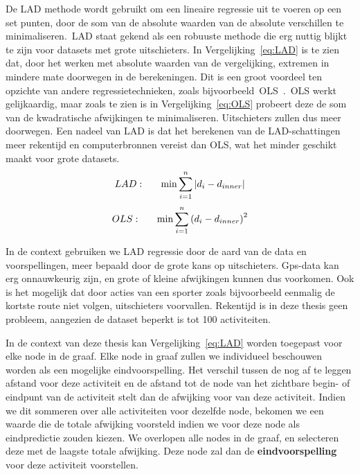 De \ac{LAD} methode wordt gebruikt om een lineaire regressie uit te voeren op
een set punten, door de som van de absolute waarden van de absolute verschillen
te minimaliseren.\ \ac{LAD} staat gekend als een robuuste methode die erg
nuttig blijkt te zijn voor datasets met grote uitschieters. In
Vergelijking~\ref{eq:LAD} is te zien dat, door het werken met absolute waarden
van de vergelijking, extremen in mindere mate doorwegen in de berekeningen. Dit
is een groot voordeel ten opzichte van andere regressietechnieken, zoals
bijvoorbeeld~\ac{OLS}~\cite{iqbal2021application}.~\ac{OLS} werkt gelijkaardig,
maar zoals te zien is in Vergelijking~\ref{eq:OLS} probeert deze de som van de
kwadratische afwijkingen te minimaliseren. Uitschieters zullen dus meer
doorwegen. Een nadeel van \ac{LAD} is dat het berekenen van de LAD-schattingen
meer rekentijd en computerbronnen vereist dan \ac{OLS}, wat het minder geschikt
maakt voor grote datasets.
\begin{equation} \label{eq:LAD}
    LAD:\indent  \min\sum\limits_{i=1}^n|d_i - d_{inner}|
\end{equation}
\begin{equation} \label{eq:OLS}
    OLS:\indent  \min\sum\limits_{i=1}^n{(d_i - d_{inner})}^2
\end{equation}

In de context gebruiken we LAD regressie door de aard van de data en
voorspellingen, meer bepaald door de grote kans op uitschieters. Gps-data kan
erg onnauwkeurig zijn, en grote of kleine afwijkingen kunnen dus voorkomen. Ook
is het mogelijk dat door acties van een sporter zoals bijvoorbeeld eenmalig de
kortste route niet volgen, uitschieters voorvallen. Rekentijd is in deze thesis
geen probleem, aangezien de dataset beperkt is tot 100 activiteiten.

In de context van deze thesis kan Vergelijking~\ref{eq:LAD} worden toegepast
voor elke node in de graaf. Elke node in graaf zullen we individueel beschouwen
worden als een mogelijke eindvoorspelling. Het verschil tussen de nog af te
leggen afstand voor deze activiteit en de afstand tot de node van het zichtbare
begin- of eindpunt van de activiteit stelt dan de afwijking voor van deze
activiteit. Indien we dit sommeren over alle activiteiten voor dezelfde node,
bekomen we een waarde die de totale afwijking voorsteld indien we voor deze
node als eindpredictie zouden kiezen. We overlopen alle nodes in de graaf, en
selecteren deze met de laagste totale afwijking. Deze node zal dan de
\textbf{eindvoorspelling} voor deze activiteit voorstellen.


